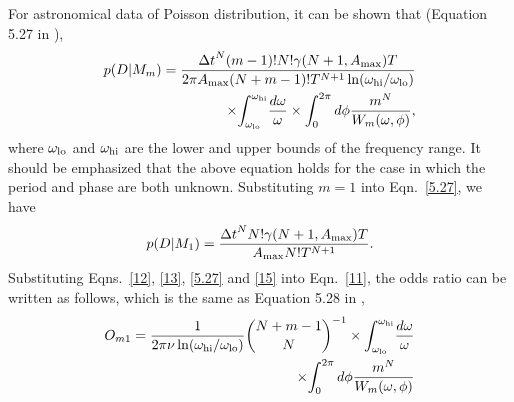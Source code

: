 \documentclass[fleqn,usenatbib]{mnras}
\begin{document}
For astronomical data of Poisson distribution, it can be shown that (Equation 5.27 in \citealp{1992ApJ...398..146G}),
\begin{equation}\label{5.27}
\begin{split}
p(D|M_m)={{{\Delta t}^N (m-1)! N! \gamma(N+1,A_{\rm max})T}\over{2\pi A_{\rm max} (N+m-1)!T^{N+1} \ln(\omega_{\rm hi}/\omega_{\rm lo})}}\\
\times {\int_{\omega_{\rm lo}}^{\omega_{\rm hi}}}{{d\omega}\over{\omega}}\times {\int_0^{2\pi}d\phi{m^N\over W_m(\omega,\phi)}},	
\end{split}
\end{equation}
where $\omega_{\rm lo}$ and $\omega_{\rm hi}$ are the lower and upper bounds of the frequency range.
It should be emphasized that the above equation holds for the case in which the period and phase are both unknown.
Substituting $m=1$ into Eqn.~\ref{5.27}, we have
\begin{equation}\label{15}
p(D|M_1)={{{\Delta t}^N N!\gamma(N+1,A_{\rm max})T}\over {A_{\rm max}N!T^{N+1}}}.
\end{equation}
Substituting Eqns.~\ref{12}, \ref{13}, \ref{5.27} and \ref{15} into Eqn.~\ref{11}, the odds ratio can be written as follows, which is the same as Equation 5.28 in \cite{1992ApJ...398..146G},
\begin{equation}\label{A16}
\begin{split}
O_{m1}={1\over{2\pi \nu \ln(\omega_{\rm hi}/\omega_{\rm lo})}} {{N+m-1}	\choose N}^{-1}\times {\int_{\omega_{\rm lo}}^{\omega_{\rm hi}}}{{d\omega}\over{\omega}}\\
\times {\int_0^{2\pi}d\phi{m^N\over W_m(\omega,\phi)}} 
\end{split}
\end{equation}
\end{document}

